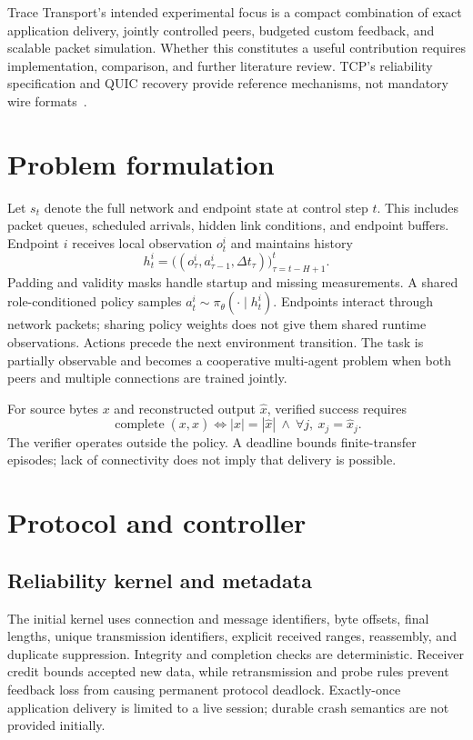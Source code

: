 \documentclass[11pt]{article}
\begin{document}
Trace Transport's intended experimental focus is a compact combination of exact
application delivery, jointly controlled peers, budgeted custom feedback, and
scalable packet simulation. Whether this constitutes a useful contribution
requires implementation, comparison, and further literature review. TCP's
reliability specification and QUIC recovery provide reference mechanisms, not
mandatory wire formats~\cite{rfc9293,rfc9002}.

\section{Problem formulation}
Let $s_t$ denote the full network and endpoint state at control step $t$. This
includes packet queues, scheduled arrivals, hidden link conditions, and endpoint
buffers. Endpoint $i$ receives local observation $o_t^i$ and maintains history
\begin{equation}
 h_t^i = \bigl((o_\tau^i,a_{\tau-1}^i,\Delta t_\tau)\bigr)_{\tau=t-H+1}^{t}.
\end{equation}
Padding and validity masks handle startup and missing measurements. A shared
role-conditioned policy samples $a_t^i\sim\pi_\theta(\cdot\mid h_t^i)$.
Endpoints interact through network packets; sharing policy weights does not
give them shared runtime observations. Actions precede the next environment
transition. The task is partially observable and becomes a cooperative multi-agent
problem when both peers and multiple connections are trained jointly.

For source bytes $x$ and reconstructed output $\hat{x}$, verified success requires
\begin{equation}
 \operatorname{complete}(x,\hat{x}) \iff
 |x|=|\hat{x}|\ \land\ \forall j,\ x_j=\hat{x}_j.
\end{equation}
The verifier operates outside the policy. A deadline bounds finite-transfer
episodes; lack of connectivity does not imply that delivery is possible.

\section{Protocol and controller}
\subsection{Reliability kernel and metadata}
The initial kernel uses connection and message identifiers, byte offsets, final
lengths, unique transmission identifiers, explicit received ranges, reassembly,
and duplicate suppression. Integrity and completion checks are deterministic.
Receiver credit bounds accepted new data, while retransmission and probe rules
prevent feedback loss from causing permanent protocol deadlock. Exactly-once
application delivery is limited to a live session; durable crash semantics are
not provided initially.
\end{document}
